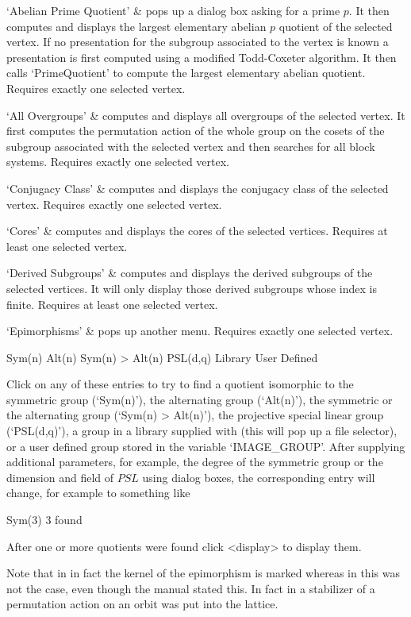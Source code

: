 \beginitems
`Abelian Prime Quotient' &
pops  up a dialog  box asking  for a  prime  $p$.  It  then computes  and
displays the largest elementary   abelian  $p$ quotient of  the  selected
vertex.  If no presentation for the  subgroup associated to the vertex is
known   a presentation is  first computed  using  a modified Todd-Coxeter
algorithm.     It then calls    `PrimeQuotient' to   compute  the largest
elementary abelian quotient.  Requires exactly one selected vertex.

`All Overgroups' &
computes and displays all overgroups  of the selected vertex.  It  first
computes the permutation action of the whole  group on the cosets of the
subgroup associated with  the selected vertex and  then searches  for all
block systems.  Requires exactly one selected vertex.

`Conjugacy Class' &
computes and  displays  the   conjugacy  class of  the   selected vertex.
Requires  exactly  one selected vertex.  

`Cores' &
computes and  displays the cores  of the selected vertices.   Requires at
least one selected vertex.

`Derived Subgroups' &
computes and displays the derived subgroups of the selected vertices.  It
will  only  display  those derived    subgroups  whose index is   finite.
Requires at least one selected vertex.

`Epimorphisms' &
pops up another menu. Requires exactly one selected vertex.

\begintt
Sym(n)
Alt(n)
Sym(n) > Alt(n)
PSL(d,q)
Library
User Defined 
\endtt

Click on any of these entries to try to find a quotient isomorphic to the
symmetric group (`Sym(n)'), the alternating group (`Alt(n)'),
the symmetric or the alternating group (`Sym(n) > Alt(n)'), the projective
special linear group (`PSL(d,q)'), a group in a library supplied with
{\XGAP} (this will pop up a file selector), or a user defined group stored
in the variable `IMAGE_GROUP'.  After supplying additional parameters, for
example, the degree of the symmetric group or the dimension and field of
$PSL$ using dialog boxes, the corresponding entry will change, for example
to something like

\begintt
Sym(3)        3 found
\endtt

After one or more quotients were found click <display> to display them.

Note that in {} in fact the kernel of the epimorphism is marked whereas 
in {} this was not the case, even though the {} manual stated this. 
In fact in {} a stabilizer of a permutation action on an orbit was
put into the lattice.

